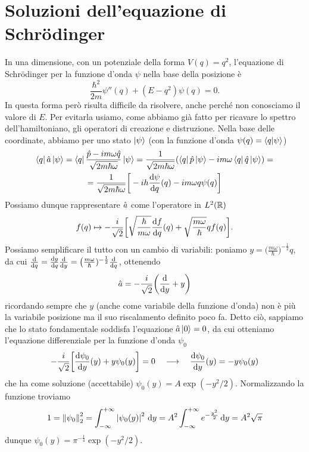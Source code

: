 \section{Soluzioni dell'equazione di Schr\"odinger}
In una dimensione, con un potenziale della forma $V(q)=q^2$, l'equazione di Schr\"odinger per la funzione d'onda $\psi$ nella base della posizione è
\begin{equation}
	\frac{\hbar^2}{2m}\psi''(q)+(E-q^2)\psi(q)=0.
	\label{eq:schrodinger-oscillatore-1d}
\end{equation}
In questa forma però risulta difficile da risolvere, anche perch\'e non conosciamo il valore di $E$.
Per evitarla usiamo, come abbiamo già fatto per ricavare lo spettro dell'hamiltoniano, gli operatori di creazione e distruzione.
Nella base delle coordinate, abbiamo per uno stato $\left|{\psi}\right\rangle$ (con la funzione d'onda $\psi(q)=\left\langle{q}\middle|{\psi}\right\rangle$)
\begin{multline}
	\left\langle{q}\right|\hat{a}\left|{\psi}\right\rangle=\left\langle{q}\right|\frac{\hat{p}-im\omega\hat{q}}{\sqrt{2m\hbar\omega}}\left|{\psi}\right\rangle=\frac1{\sqrt{2m\hbar\omega}}(\left\langle{q}\right|\hat{p}\left|{\psi}\right\rangle-im\omega\left\langle{q}\right|\hat{q}\left|{\psi}\right\rangle)=\\
	=\frac1{\sqrt{2m\hbar\omega}}\bigg[-ih\frac{\textup{d} {\psi}}{\textup{d} {q}}(q)-im\omega q\psi(q)\bigg]
\end{multline}
Possiamo dunque rappresentare $\hat{a}$ come l'operatore in $L^2(\mathbb{R})$
\begin{equation}
	f(q)\mapsto-\frac{i}{\sqrt{2}}\bigg[\sqrt{\frac{\hbar}{m\omega}}\frac{\textup{d} {f}}{\textup{d} {q}}(q)+\sqrt{\frac{m\omega}{\hbar}}qf(q)\bigg].
\end{equation}
Possiamo semplificare il tutto con un cambio di variabili: poniamo $y=\big(\frac{m\omega}{\hbar})^{-\frac12}q$, da cui $\frac{\textup{d} {}}{\textup{d} {q}}=\frac{\textup{d} {y}}{\textup{d} {q}}\frac{\textup{d} {}}{\textup{d} {y}}=\big(\frac{m\omega}{\hbar})^{-\frac12}\frac{\textup{d} {}}{\textup{d} {q}}$, ottenendo
\begin{equation}
	\hat{a}=-\frac{i}{\sqrt{2}}\bigg(\frac{\textup{d} {}}{\textup{d} {y}}+y\bigg)
\end{equation}
ricordando sempre che $y$ (anche come variabile della funzione d'onda) non è più la variabile posizione ma il suo riscalamento definito poco fa.
Detto ciò, sappiamo che lo stato fondamentale soddisfa l'equazione $\hat{a}\left|{0}\right\rangle=0$, da cui otteniamo l'equazione differenziale per la funzione d'onda $\psi_0$
\begin{equation}
	-\frac{i}{\sqrt{2}}\bigg[\frac{\textup{d} {\psi_0}}{\textup{d} {y}}(y)+y\psi_0(y)\bigg]=0\quad\longrightarrow\quad \frac{\textup{d} {\psi_0}}{\textup{d} {y}}(y)=-y\psi_0(y)
\end{equation}
che ha come soluzione (accettabile) $\psi_0(y)=A\exp(-y^2/2)$.
Normalizzando la funzione troviamo
\begin{equation}
	1=\left\|{\psi_0}\right\|_2^2=\int_{-\infty}^{+\infty}\left|{\psi_0(y)}\right|^2\,\textup{d} y=A^2\int_{-\infty}^{+\infty}e^{-\frac{y^2}2}\,\textup{d} y=A^2\sqrt{\pi}
\end{equation}
dunque $\psi_0(y)=\pi^{-\frac14}\exp(-y^2/2)$.

